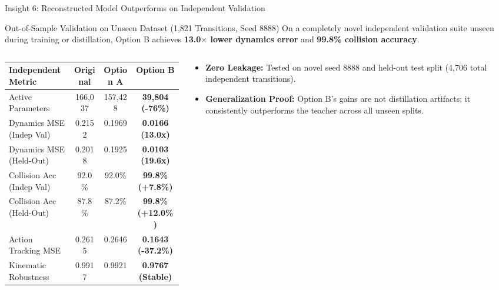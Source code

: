 \documentclass[aspectratio=169, 10pt]{beamer}
\begin{document}
\begin{frame}{Insight 6: Reconstructed Model Outperforms on Independent Validation}
  \begin{block}{Out-of-Sample Validation on Unseen Dataset (1,821 Transitions, Seed 8888)}
    On a completely novel independent validation suite unseen during training or distillation, Option B achieves \textbf{13.0$\times$ lower dynamics error} and \textbf{99.8\% collision accuracy}.
  \end{block}
  \vspace{-0.2cm}
  \begin{columns}[T]
    \begin{column}{0.54\textwidth}
      \setlength{\tabcolsep}{2pt}
      \begin{table}
        \centering
        \scriptsize
        \begin{tabular}{lccc}
          \toprule
          \textbf{Independent Metric} & \textbf{Original} & \textbf{Option A} & \textbf{Option B} \\
          \midrule
          Active Parameters & 166,037 & 157,428 & \textbf{39,804 (-76\%)} \\
          Dynamics MSE (Indep Val) & 0.2152 & 0.1969 & \textbf{0.0166 (13.0x)} \\
          Dynamics MSE (Held-Out) & 0.2018 & 0.1925 & \textbf{0.0103 (19.6x)} \\
          Collision Acc (Indep Val) & 92.0\% & 92.0\% & \textbf{99.8\% (+7.8\%)} \\
          Collision Acc (Held-Out) & 87.8\% & 87.2\% & \textbf{99.8\% (+12.0\%)} \\
          Action Tracking MSE & 0.2615 & 0.2646 & \textbf{0.1643 (-37.2\%)} \\
          Kinematic Robustness & 0.9917 & 0.9921 & \textbf{0.9767 (Stable)} \\
          \bottomrule
        \end{tabular}
      \end{table}
    \end{column}
    \begin{column}{0.44\textwidth}
      \begin{itemize}
        \item \textbf{Zero Leakage:} Tested on novel seed 8888 and held-out test split (4,706 total independent transitions).
        \item \textbf{Generalization Proof:} Option B's gains are not distillation artifacts; it consistently outperforms the teacher across all unseen splits.
      \end{itemize}
    \end{column}
  \end{columns}
\end{frame}
\end{document}
